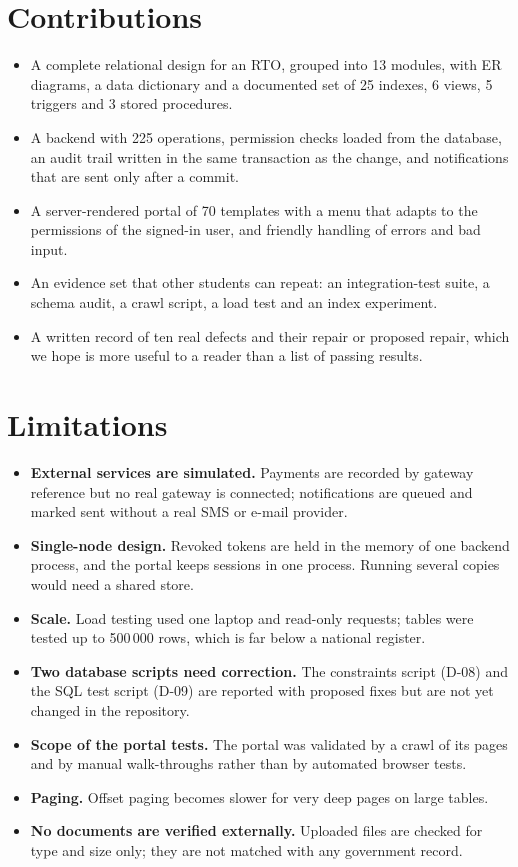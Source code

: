 \section{Contributions}
\begin{itemize}
\item A complete relational design for an RTO, grouped into 13 modules, with ER diagrams, a data dictionary and a documented set of 25 indexes, 6 views, 5 triggers and 3 stored procedures.
\item A backend with 225 operations, permission checks loaded from the database, an audit trail written in the same transaction as the change, and notifications that are sent only after a commit.
\item A server-rendered portal of 70 templates with a menu that adapts to the permissions of the signed-in user, and friendly handling of errors and bad input.
\item An evidence set that other students can repeat: an integration-test suite, a schema audit, a crawl script, a load test and an index experiment.
\item A written record of ten real defects and their repair or proposed repair, which we hope is more useful to a reader than a list of passing results.
\end{itemize}

\section{Limitations}
\begin{itemize}
\item \textbf{External services are simulated.} Payments are recorded by gateway reference but no real gateway is connected; notifications are queued and marked sent without a real SMS or e-mail provider.
\item \textbf{Single-node design.} Revoked tokens are held in the memory of one backend process, and the portal keeps sessions in one process. Running several copies would need a shared store.
\item \textbf{Scale.} Load testing used one laptop and read-only requests; tables were tested up to 500\,000 rows, which is far below a national register.
\item \textbf{Two database scripts need correction.} The constraints script (D-08) and the SQL test script (D-09) are reported with proposed fixes but are not yet changed in the repository.
\item \textbf{Scope of the portal tests.} The portal was validated by a crawl of its pages and by manual walk-throughs rather than by automated browser tests.
\item \textbf{Paging.} Offset paging becomes slower for very deep pages on large tables.
\item \textbf{No documents are verified externally.} Uploaded files are checked for type and size only; they are not matched with any government record.
\end{itemize}

